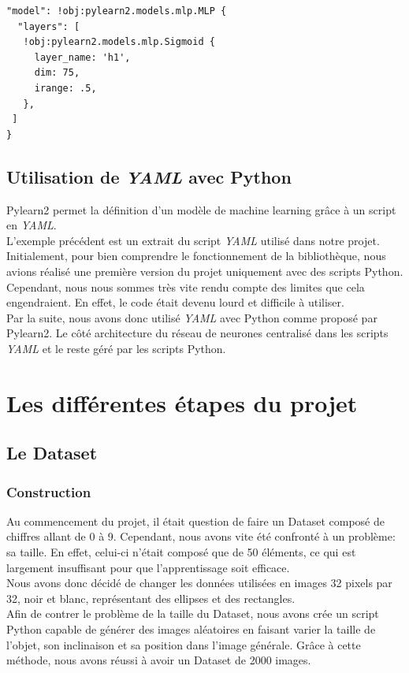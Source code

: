 \documentclass[12pt, a4paper]{article}
\begin{document}
\begin{verbatim}
"model": !obj:pylearn2.models.mlp.MLP {
  "layers": [
   !obj:pylearn2.models.mlp.Sigmoid {
     layer_name: 'h1',
     dim: 75,
     irange: .5,
   },
 ]
}
\end{verbatim}

\subsection{Utilisation de \emph{YAML} avec Python}
Pylearn2 permet la définition d'un modèle de machine learning grâce à un script en \emph{YAML}.\\ L'exemple précédent est un extrait du script \emph{YAML} utilisé dans notre projet. 
\\

Initialement, pour bien comprendre le fonctionnement de la bibliothèque, nous avions réalisé une première version du projet uniquement avec des scripts Python. 
\\ Cependant, nous nous sommes très vite rendu compte des limites que cela engendraient. En effet, le code était devenu lourd et difficile à utiliser. 
\\

Par la suite, nous avons donc utilisé \emph{YAML} avec Python comme proposé par Pylearn2. Le côté architecture du réseau de neurones centralisé dans les scripts \emph{YAML} et le reste géré par les scripts Python. 

\section{Les différentes étapes du projet}
	\subsection{Le Dataset}
		\subsubsection{Construction}
Au commencement du projet, il était question de faire un Dataset composé de chiffres allant de 0 à 9. 
Cependant, nous avons vite été confronté à un problème: sa taille. En effet, celui-ci n'était composé que de 50 éléments, ce qui est largement insuffisant pour que l'apprentissage soit efficace.
\\

 Nous avons donc décidé de changer les données utilisées en images 32 pixels par 32, noir et blanc, représentant des ellipses et des rectangles.
\\Afin de contrer le problème de la taille du Dataset, nous avons crée un script Python capable de générer des images aléatoires en faisant varier la taille de l'objet, son inclinaison et sa position dans l'image générale. Grâce à cette méthode, nous avons réussi à avoir un Dataset de 2000 images. 
\end{document}
